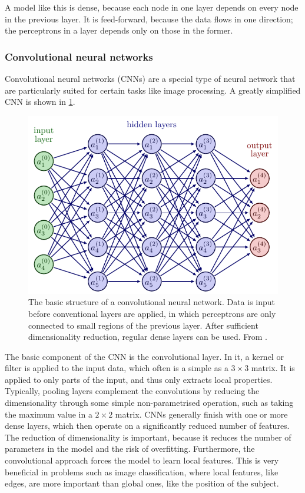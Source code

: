 A model like this is dense, because each node in one layer depends on every node in the previous layer.
It is feed-forward, because the data flows in one direction; the perceptrons in a layer depends only on those in the former.



\subsubsection{Convolutional neural networks}
Convolutional neural networks (CNNs) are a special type of neural network that are particularly suited for certain tasks like image processing.
A greatly simplified CNN is shown in \cref{fig:cnn}.

\begin{figure}
    \centering
    \includegraphics[width=0.8\linewidth, page=7]{tex/02_ml/neural_networks.pdf}
    \caption{
        The basic structure of a convolutional neural network.
        Data is input before conventional layers are applied, in which perceptrons are only connected to small regions of the previous layer.
        After sufficient dimensionality reduction, regular dense layers can be used.
        From \cite{nn_figs}.
    }
    \label{fig:cnn}
\end{figure}

The basic component of the CNN is the convolutional layer.
In it, a kernel or filter is applied to the input data, which often is a simple as a $3 \times 3$ matrix.
It is applied to only parts of the input, and thus only extracts local properties.
Typically, pooling layers complement the convolutions by reducing the dimensionality through some simple non-parametrised operation, such as taking the maximum value in a $2 \times 2$ matrix.
CNNs generally finish with one or more dense layers, which then operate on a significantly reduced number of features.
The reduction of dimensionality is important, because it reduces the number of parameters in the model and the risk of overfitting.
Furthermore, the convolutional approach forces the model to learn local features.
This is very beneficial in problems such as image classification, where local features, like edges, are more important than global ones, like the position of the subject.
